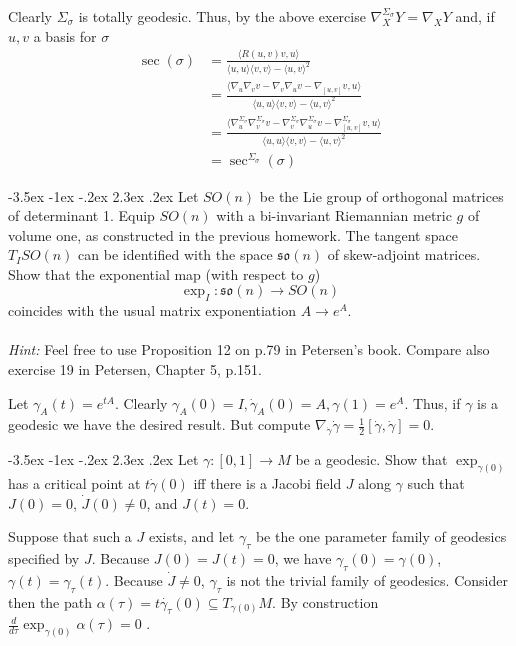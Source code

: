 \documentclass[10pt]{article}
\makeatletter
\renewcommand\section{\@startsection{section}{1}{\z@}%
                                  {-3.5ex \@plus -1ex \@minus -.2ex}%
                                  {2.3ex \@plus.2ex}%
                                  {\normalfont\large\bfseries}}
\DeclareMathOperator{\2}{II}
\newcommand{\hint}[1]{{\emph{Hint:} #1}} %
\makeatother
\begin{document}
Clearly $\Sigma_\sigma$ is totally geodesic. Thus, by the above exercise $\nabla_X^{\Sigma_\sigma} Y = \nabla_X Y$ and, if $u,v$ a basis for $\sigma$
\begin{align*}
	\sec(\sigma) &= \frac{ \langle R(u,v) v, u \rangle}{\langle u,u \rangle \langle v,v \rangle - \langle u, v \rangle^2}\\
	&= \frac{ \langle \nabla_u \nabla_v v - \nabla_v \nabla_u v - \nabla_{[u,v]} v , u \rangle}{\langle u,u \rangle \langle v,v \rangle - \langle u, v \rangle^2}\\ 
	&= \frac{ \langle \nabla^{\Sigma_\sigma}_u \nabla^{\Sigma_\sigma}_v v - \nabla^{\Sigma_\sigma}_v \nabla^{\Sigma_\sigma}_u v - \nabla^{\Sigma_\sigma}_{[u,v]} v , u \rangle}{\langle u,u \rangle \langle v,v \rangle - \langle u, v \rangle^2}\\ 
	&= \sec^{\Sigma_\sigma}(\sigma)
\end{align*}

\section{Let $SO(n)$ be the Lie group of orthogonal matrices of determinant 1. Equip $SO(n)$ with a bi-invariant Riemannian metric $g$ of volume one, as constructed in the previous homework. The tangent space $T_I SO(n)$ can be identified with the space $\mathfrak{so}(n)$ of skew-adjoint matrices. Show that the exponential map (with respect to $g$) $$\exp_I : \mathfrak{so}(n) \to SO(n)$$ coincides with the usual matrix exponentiation $A \to e^A$. \\\\ \hint{Feel free to use Proposition 12 on p.79 in Petersen's book. Compare also exercise 19 in Petersen, Chapter 5, p.151.}}

Let $\gamma_A(t) = e^{tA}$. Clearly $\gamma_A(0) = I, \dot{\gamma}_A(0) = A, \gamma(1) = e^A$. Thus, if $\gamma$ is a geodesic we have the desired result. But compute $\nabla_{\dot{\gamma}}  \dot{\gamma} = \frac{1}{2}[\dot{\gamma}, \dot{\gamma}] =0.$

\section{Let $\gamma :[0,1] \to M$ be a geodesic. Show that $\exp_{\gamma(0)}$ has a critical point at $t \dot{\gamma}(0)$ iff there is a Jacobi field $J$ along $\gamma$ such that $J(0) = 0$, $\dot{J}(0) \neq 0$, and $J(t) =0$.}

Suppose that such a $J$ exists, and let $\gamma_\tau$ be the one parameter family of geodesics specified by $J$. Because $J(0)= J(t) = 0$, we have $\gamma_\tau (0) = \gamma(0)$, $\gamma(t) = \gamma_\tau(t)$. Because $\dot{J} \neq 0$, $\gamma_\tau$ is not the trivial family of geodesics. Consider then  the path $\alpha(\tau)  = t \dot{\gamma_\tau}(0) \subseteq T_{\gamma(0)}M$. By construction $ \frac{d}{d \tau} \exp_{\gamma(0)} \alpha(\tau) =0$ .
\end{document}
